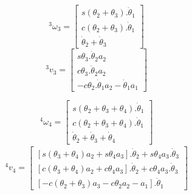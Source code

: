 \begin{multicols}{2}
    \noindent
    \begin{equation}
        ^3\omega_3 = \begin{bmatrix}
                        s(\theta_2+\theta_3).\dot{\theta}_1 \\
                        c(\theta_2+\theta_3).\dot{\theta}_1 \\ 
                        \dot{\theta}_2 + \dot{\theta}_3
                    \end{bmatrix}
    \end{equation}
    \begin{equation}
        ^3v_3 = \begin{bmatrix}
                    s\theta_3.\dot{\theta}_2a_2 \\ 
                    c\theta_3.\dot{\theta}_2a_2\\ 
                    -c\theta_2.\dot{\theta}_1a_2 - \dot{\theta}_1a_1
                \end{bmatrix}
    \end{equation}
\end{multicols}

\begin{multicols}{2}
    \noindent
    \begin{equation}
        ^4\omega_4 = \begin{bmatrix}
                        s(\theta_2+\theta_3+\theta_4).\dot{\theta}_1 \\
                        c(\theta_2+\theta_3+\theta_4).\dot{\theta}_1 \\ 
                        \dot{\theta}_2 + \dot{\theta}_3 + \dot{\theta}_4
                    \end{bmatrix}
    \end{equation}
    \begin{equation}
        \begin{split}
            ^4v_4 = \begin{bmatrix}
                    [s(\theta_3+\theta_4)a_2 + s\theta_4a_3].\dot{\theta}_2 + s\theta_4a_3.\dot{\theta}_3 \\ 
                    [c(\theta_3+\theta_4)a_2 + c\theta_4a_3].\dot{\theta}_2 + c\theta_4a_3.\dot{\theta}_3 \\ 
                    [-c(\theta_2 + \theta_3)a_3 - c\theta_2a_2 - a_1].\dot{\theta}_1
                \end{bmatrix}
        \end{split}
    \end{equation}
\end{multicols}

